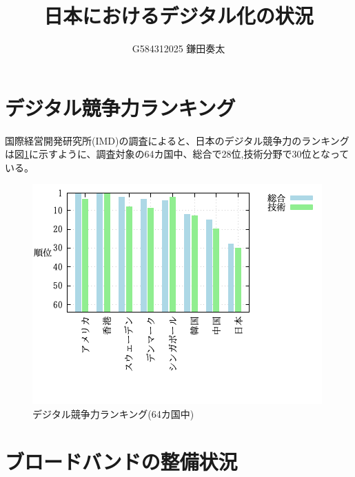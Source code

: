\documentclass[a4paper,11pt,dvipdfmx]{ujarticle}
\title{日本におけるデジタル化の状況}
\author{G584312025 鎌田奏太}
\begin{document}
\maketitle 
\section{デジタル競争力ランキング}
国際経営開発研究所(IMD)の調査\cite{imd}によると、日本のデジタル競争力のランキングは図\ref{fig:fok}に示すように、調査対象の64カ国中、総合で28位,技術分野で30位となっている。
\begin{figure}[htbp]
    \centering
    \includegraphics[scale=0.5]{fig41.png}
    \caption{デジタル競争力ランキング(64カ国中)}\label{fig:fok}
\end{figure}
\newpage
\section{ブロードバンドの整備状況}
\end{document}
